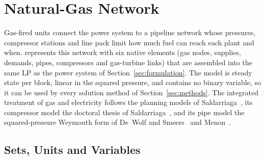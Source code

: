 
\section{Natural-Gas Network}
\label{sec:gas}

Gas-fired units connect the power system to a pipeline network whose
pressures, compressor stations and line pack limit how much fuel can
reach each plant and when.  \gtopt{} represents this network with six
native elements (gas nodes, supplies, demands, pipes, compressors and
gas-turbine links) that are assembled into the same LP as the power
system of Section~\ref{sec:formulation}.  The model is steady state per
block, linear in the squared pressure, and contains no binary variable,
so it can be used by every solution method of
Section~\ref{sec:methods}.  The integrated treatment of gas and
electricity follows the planning models of
Saldarriaga~\cite{saldarriaga2013msc, saldarriaga2013holistic,
saldarriaga2019stochastic}, its compressor model the doctoral thesis of
Saldarriaga~\cite{saldarriaga2018phd}, and its pipe model the
squared-pressure Weymouth form of De~Wolf and
Smeers~\cite{dewolf2000gas} and Menon~\cite{menon2005gas}.

\subsection{Sets, Units and Variables}

